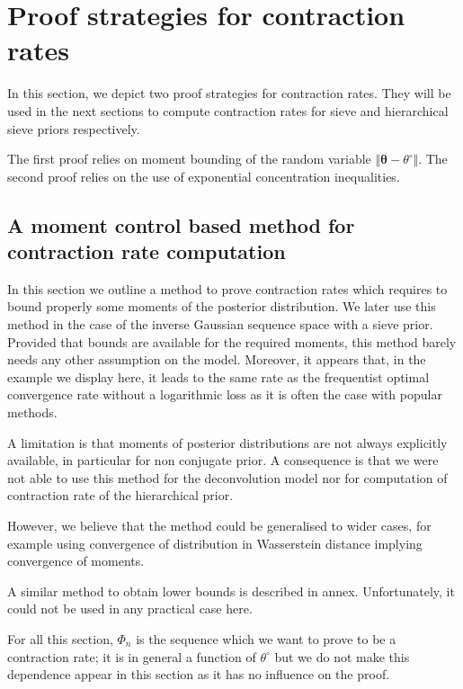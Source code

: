 \section{Proof strategies for contraction rates}\label{BAYES_STRATEGIES}

In this section, we depict two proof strategies for contraction rates.
They will be used in the next sections to compute contraction rates for sieve and hierarchical sieve priors respectively.

The first proof relies on moment bounding of the random variable $\Vert \boldsymbol{\theta} - \theta^{\circ} \Vert$.
The second proof relies on the use of exponential concentration inequalities.

\subsection{A moment control based method for contraction rate computation}\label{BAYES_STRATEGIES_MOMENT}

In this section we outline a method to prove contraction rates which requires to bound properly some moments of the posterior distribution.
We later use this method in the case of the inverse Gaussian sequence space with a sieve prior.
Provided that bounds are available for the required moments, this method barely needs any other assumption on the model.
Moreover, it appears that, in the example we display here, it leads to the same rate as the frequentist optimal convergence rate without a logarithmic loss as it is often the case with popular methods.

A limitation is that moments of posterior distributions are not always explicitly available, in particular for non conjugate prior.
A consequence is that we were not able to use this method for the deconvolution model nor for computation of contraction rate of the hierarchical prior.

However, we believe that the method could be generalised to wider cases, for example using convergence of distribution in Wasserstein distance implying convergence of moments.

A similar method to obtain lower bounds is described in annex.
Unfortunately, it could not be used in any practical case here.

\bigskip

For all this section, $\Phi_{n}$ is the sequence which we want to prove to be a contraction rate; it is in general a function of $\theta^{\circ}$ but we do not make this dependence appear in this section as it has no influence on the proof.

